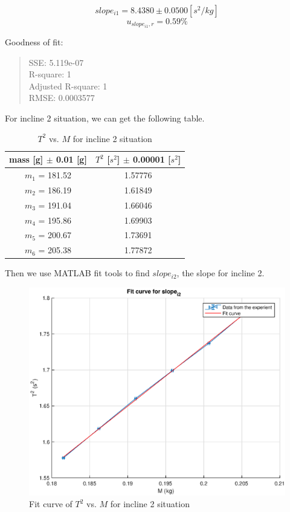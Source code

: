 $$slope_{i1} = 8.4380 \pm 0.0500 [s^2/kg] $$
$$ u_{slope_{i1},r} = 0.59 \% $$

Goodness of fit:
\begin{quote}
	\centering
  SSE: 5.119e-07 \\ 
  R-square: 1 \\ 
  Adjusted R-square: 1 \\ 
  RMSE: 0.0003577 \\ 
\end{quote}

For incline 2 situation, we can get the following table.

\begin{table}[H]
	\centering
	\begin{tabular}{|c|c|}
	\hline
	mass [g] $\pm$ 0.01 [g] & $T^2$ [$s^2$] $\pm$ 0.00001 [$s^2$] \\ \hline
	$m_1$ = 181.52  & 1.57776 \\ \hline
	$m_2$ = 186.19  & 1.61849 \\ \hline
	$m_3$ = 191.04  & 1.66046 \\ \hline
	$m_4$ = 195.86  & 1.69903 \\ \hline
	$m_5$ = 200.67  & 1.73691 \\ \hline
	$m_6$ = 205.38  & 1.77872 \\ \hline
	\end{tabular}
	\caption{$T^2$ vs. $M$ for incline 2 situation}
\label{T2vsM_2}
\end{table}

Then we use MATLAB fit tools to find $slope_{i2}$, the slope for incline 2.

\begin{figure}[H]
	\centering
	\includegraphics[width=13cm]{matlab/fitfig/m3}
	\caption{Fit curve of $T^2$ vs. $M$ for incline 2 situation}
\end{figure}

